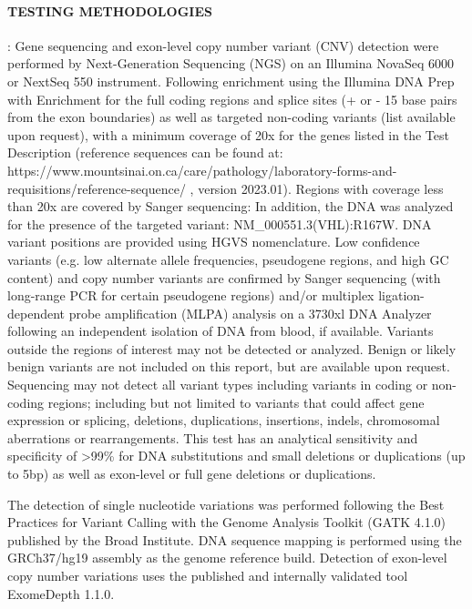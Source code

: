 \documentclass[10pt]{extarticle}
\begin{document}
\paragraph{TESTING METHODOLOGIES}: Gene sequencing and exon-level copy number variant (CNV) detection were performed by Next-Generation Sequencing (NGS) on an Illumina NovaSeq 6000 or NextSeq 550 instrument. Following enrichment using the Illumina DNA Prep with Enrichment for the full coding regions and splice sites (+ or - 15 base pairs from the exon boundaries) as well as targeted non-coding variants (list available upon request), with a minimum coverage of 20x for the genes listed in the Test Description (reference sequences can be found at: https://www.mountsinai.on.ca/care/pathology/laboratory-forms-and-requisitions/reference-sequence/ , version 2023.01). Regions with coverage less than 20x are covered by Sanger sequencing: In addition, the DNA was analyzed for the presence of the targeted variant: NM\_000551.3(VHL):R167W. DNA variant positions are provided using HGVS nomenclature. Low confidence variants (e.g. low alternate allele frequencies, pseudogene regions, and high GC content) and copy number variants are confirmed by Sanger sequencing (with long-range PCR for certain pseudogene regions) and/or multiplex ligation-dependent probe amplification (MLPA) analysis on a 3730xl DNA Analyzer following an independent isolation of DNA from blood, if available. Variants outside the regions of interest may not be detected or analyzed. Benign or likely benign variants are not included on this report, but are available upon request. Sequencing may not detect all variant types including variants in coding or non-coding regions; including but not limited to variants that could affect gene expression or splicing, deletions, duplications, insertions, indels, chromosomal aberrations or rearrangements. This test has an analytical sensitivity and specificity of >99\% for DNA substitutions and small deletions or duplications (up to 5bp) as well as exon-level or full gene deletions or duplications.

The detection of single nucleotide variations was performed following the Best Practices for Variant Calling with the Genome Analysis Toolkit (GATK 4.1.0) published by the Broad Institute. DNA sequence mapping is performed using the GRCh37/hg19 assembly as the genome reference build. Detection of exon-level copy number variations uses the published and internally validated tool ExomeDepth 1.1.0.
\end{document}
